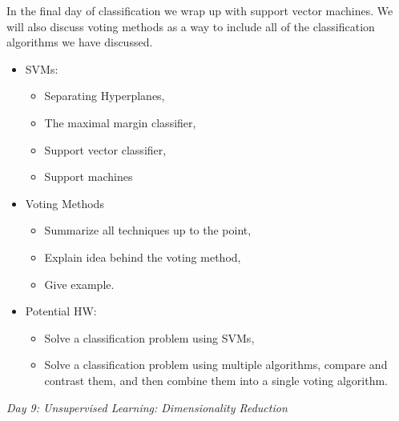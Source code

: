 \documentclass[12pt]{article}
\begin{document}
	\noindent
	In the final day of classification we wrap up with support vector machines. We will also discuss voting methods as a way to include all of the classification algorithms we have discussed.
	\begin{itemize}
		\item SVMs:
			\begin{itemize}
				\item Separating Hyperplanes,
				\item The maximal margin classifier,
				\item Support vector classifier,
				\item Support machines
			\end{itemize}
		\item Voting Methods
			\begin{itemize}
				\item Summarize all techniques up to the point,
				\item Explain idea behind the voting method,
				\item Give example.
			\end{itemize}
		\item Potential HW:
			\begin{itemize}
				\item Solve a classification problem using SVMs,
				\item Solve a classification problem using multiple algorithms, compare and contrast them, and then combine them into a single voting algorithm.
			\end{itemize}
	\end{itemize}
	
	\vspace{2mm}
	\noindent
	\textit{\large{Day 9: Unsupervised Learning: Dimensionality Reduction}}
	
\end{document}
